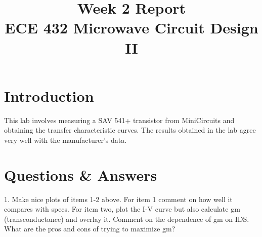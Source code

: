 \documentclass[conference]{IEEEtran}
\begin{document}
\title{Week 2 Report\\ECE 432 Microwave Circuit Design II}

\author{
\and
{}
}
\maketitle



\IEEEpeerreviewmaketitle


\section{Introduction}
This lab involves measuring a SAV 541+ transistor from MiniCircuits and obtaining the transfer characteristic curves.  The results obtained in the lab agree very well with the manufacturer's data.
\section{Questions \& Answers}
1. Make nice plots of items 1-2 above. For item 1 comment on how well it compares with specs. For item two, plot the I-V curve but also calculate gm (transconductance) and overlay it. Comment on the dependence of gm on IDS. What are the pros and cons of trying to maximize gm?\\\\\\
\end{document}
